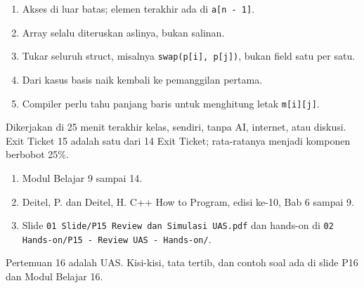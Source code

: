 \documentclass[a4paper]{article}
\begin{document}
\begin{Jawaban}[]
\begin{enumerate}[leftmargin=16pt]
\item Akses di luar batas; elemen terakhir ada di \texttt{a[n - 1]}.
\item Array selalu diteruskan aslinya, bukan salinan.
\item Tukar seluruh struct, misalnya \texttt{swap(p[i], p[j])}, bukan field satu per satu.
\item Dari kasus basis naik kembali ke pemanggilan pertama.
\item Compiler perlu tahu panjang baris untuk menghitung letak \texttt{m[i][j]}.
\end{enumerate}
\end{Jawaban}
Dikerjakan di 25 menit terakhir kelas, sendiri, tanpa AI, internet, atau diskusi. Exit Ticket 15 adalah satu dari 14 Exit Ticket; rata-ratanya menjadi komponen berbobot 25\%.
\par\vspace{4pt}\par\vspace{6pt}
\begin{enumerate}
\item Modul Belajar 9 sampai 14.
\item Deitel, P. dan Deitel, H. C++ How to Program, edisi ke-10, Bab 6 sampai 9.
\item Slide \texttt{01 Slide/P15 Review dan Simulasi UAS.pdf} dan hands-on di \texttt{02 Hands-on/P15 - Review UAS - Hands-on/}.
\end{enumerate}
\begin{Penting}
Pertemuan 16 adalah UAS. Kisi-kisi, tata tertib, dan contoh soal ada di slide P16 dan Modul Belajar 16.
\end{Penting}
\end{document}
